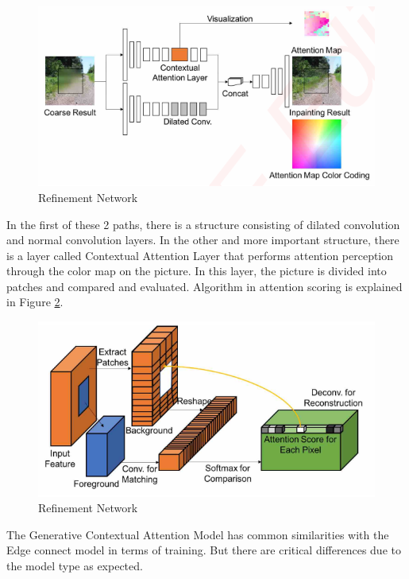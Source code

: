 \begin{figure}[h!]
    \centering
    \includegraphics[scale=0.85]{figures/chapter4/GenerativeAttention.PNG}
    \caption{Refinement Network \cite{generative_contextual}}
    \label{fig:refinement-network}
\end{figure}

In the first of these 2 paths, there is a structure consisting of dilated convolution and normal convolution layers. In the other and more important structure, there is a layer called Contextual Attention Layer that performs attention perception through the color map on the picture. In this layer, the picture is divided into patches and compared and evaluated. Algorithm in attention scoring is explained in Figure \ref{fig:attention-scoring}.

\begin{figure}[h!]
    \centering
    \includegraphics[scale=0.85]{figures/chapter4/GenerativeScoring.PNG}
    \caption{Refinement Network \cite{generative_contextual}}
    \label{fig:attention-scoring}
\end{figure}

The Generative Contextual Attention Model has common similarities with the Edge connect model in terms of training. But there are critical differences due to the model type as expected. 

